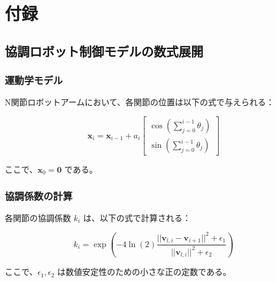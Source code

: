 
\chapter{付録}
\label{app:appendix}

\section{協調ロボット制御モデルの数式展開}
\label{app:robot_model}

\subsection{運動学モデル}

N関節ロボットアームにおいて、各関節の位置は以下の式で与えられる：

\begin{equation}
\mathbf{x}_i = \mathbf{x}_{i-1} + a_i \begin{bmatrix} \cos(\sum_{j=0}^{i-1} \theta_j) \\ \sin(\sum_{j=0}^{i-1} \theta_j) \end{bmatrix}
\end{equation}

ここで、$\mathbf{x}_0 = \mathbf{0}$ である。

\subsection{協調係数の計算}

各関節の協調係数 $k_i$ は、以下の式で計算される：

\begin{equation}
k_i = \exp\left(-4\ln(2) \frac{||\mathbf{v}_{l,i} - \mathbf{v}_{i+1}||^2 + \epsilon_1}{||\mathbf{v}_{l,i}||^2 + \epsilon_2}\right)
\end{equation}

ここで、$\epsilon_1, \epsilon_2$ は数値安定性のための小さな正の定数である。

